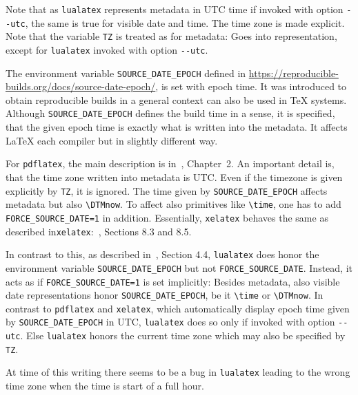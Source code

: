 \documentclass[a4paper, english]{article}%
\newcommand{\pdflatex}{\texttt{pdflatex}}
\newcommand{\lualatex}{\texttt{lualatex}}
\newcommand{\xelatex}{\texttt{xelatex}}
\newcommand{\cmd}[1]{\texttt{\textbackslash#1}}
\begin{document}
Note that as \lualatex{} represents metadata in UTC time if invoked with option \texttt{-{}-utc}, 
the same is true for visible date and time. 
The time zone is made explicit. 
Note that the variable \texttt{TZ} is treated as for metadata: 
Goes into representation, except for \lualatex{} invoked with option \texttt{-{}-utc}. 
\medskip








The environment variable \texttt{SOURCE\_DATE\_EPOCH} 
defined in \url{https://reproducible-builds.org/docs/source-date-epoch/}, 
is set with epoch time. 
It was introduced to obtain reproducible builds in a general context 
can also be used in \TeX{} systems. 
Although \texttt{SOURCE\_DATE\_EPOCH} defines the build time in a sense, 
it is specified, that the given epoch time is exactly what is written into the metadata. 
It affects \LaTeX{} each compiler but in slightly different way. 

For \pdflatex, the main description is in~\cite{PdfTexUsr24}, Chapter~2.
An important detail is, that the time zone written into metadata is UTC. 
Even if the timezone is given explicitly by \texttt{TZ}, it is ignored. 
The time given by \texttt{SOURCE\_DATE\_EPOCH} affects metadata but also \cmd{DTMnow}. 
To affect also primitives like \cmd{time}, 
one has to add \texttt{FORCE\_SOURCE\_DATE=1} in addition. 
Essentially, \xelatex{} behaves the same as described in\xelatex:~\cite{XeTexRef24}, Sections 8.3 and 8.5. 

In contrast to this, as described in~\cite{LuaTexRef24}, Section 4.4, 
\lualatex{} does honor the environment variable \texttt{SOURCE\_DATE\_EPOCH} but not \texttt{FORCE\_SOURCE\_DATE}. 
Instead, it acts as if \texttt{FORCE\_SOURCE\_DATE=1} is set implicitly: 
Besides metadata, also visible date representations honor \texttt{SOURCE\_DATE\_EPOCH}, 
be it \cmd{time} or \cmd{DTMnow}. 
In contrast to \pdflatex{} and \xelatex, 
which automatically display epoch time given by \texttt{SOURCE\_DATE\_EPOCH} in UTC, 
\lualatex{} does so only if invoked with option \texttt{-{}-utc}. 
Else \lualatex{} honors the current time zone 
which may also be specified by \texttt{TZ}. 








At time of this writing there seems to be a bug in \lualatex{} 
leading to the wrong time zone 
when the time is start of a full hour. 
\end{document}
